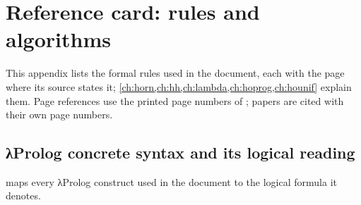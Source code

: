 \providecommand{\RLfoc}[3]{#1;#2\xrightarrow{\;#3\;}}   %
\providecommand{\RLst}[2]{\langle #1;\ #2\rangle}         %
\providecommand{\RLto}{\;\Longrightarrow\;}

\chapter{Reference card: rules and algorithms}\label{app:rules}

This appendix lists the formal rules used in the document, each with the page where its source states it; \cref{ch:horn,ch:hh,ch:lambda,ch:hoprog,ch:hounif} explain them.
Page references  use the printed page numbers of \cite{MillerNadathur2012}; papers are cited with their own page numbers.

\section{λProlog concrete syntax and its logical reading}\label{sec:rules-syntax}

 maps every λProlog construct used in the document to the logical formula it denotes.

